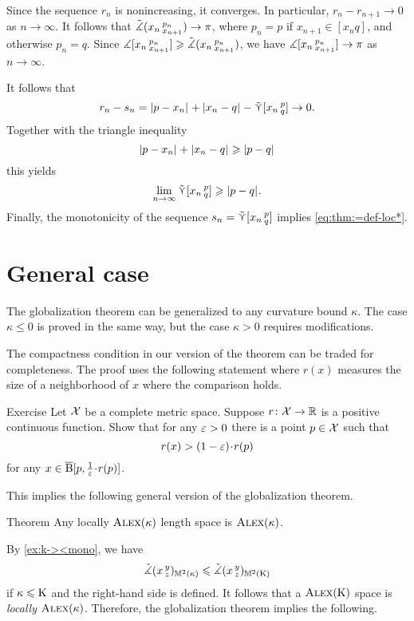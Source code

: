 Since the sequence $r_n$ is nonincreasing, it converges.
In particular, $r_n-r_{n+1}\to 0$ as $n\to\infty$.
It follows that $\tilde\measuredangle(x_n\,{}^{p_n}_{x_{n+1}})\to \pi$,
where $p_n=p$ if $x_{n+1}\in [x_nq]$, and otherwise $p_n=q$.
Since $\measuredangle[x_n\,{}^{p_n}_{x_{n+1}}]\geqslant\tilde\measuredangle(x_n\,{}^{p_n}_{x_{n+1}})$, we have
$\measuredangle[x_n\,{}^{p_n}_{x_{n+1}}]\to \pi$  as $n\to\infty$.

It follows that
\[r_n-s_n=|{p}-{x_n}|_{}^{{}}+|{x_n}-{q}|_{}^{{}}-\mathop{\tilde\curlyvee}\nolimits [x_n\,{}^{p}_{q}]\to 0.\] 
Together with the triangle inequality
\[
|{p}-{x_n}|_{}^{{}}+|{x_n}-{q}|_{}^{{}}\geqslant|{p}-{q}|_{}^{{}}
\]
this yields
\[\lim_{n\to\infty}\mathop{\tilde\curlyvee}\nolimits [x_n\,{}^{p}_{q}]\geqslant |{p}-{q}|_{}^{{}}.\]
Finally, the monotonicity of the sequence $s_n=\mathop{\tilde\curlyvee}\nolimits [x_n\,{}^{p}_{q}]$ implies \ref{eq:thm:=def-loc*}.
\qeds

\section{General case}

The globalization theorem  can be generalized to any curvature bound $\kappa$.
The case $\kappa\le 0$ is proved in the same way, but the case $\kappa>0$ requires modifications.

The compactness condition in our version of the theorem can be traded for completeness.
The proof uses the following statement where $r(x)$ measures the size of a neighborhood of $x$ where the comparison holds.

\begin{thm}{Exercise}\label{ex:alm-min}
Let $\mathcal{X}$ be a complete metric space.
Suppose $r\colon\mathcal{X}\to \mathbb{R}$ is a positive continuous function.
Show that for any $\varepsilon>0$ there is a point $p\in \mathcal{X}$ such that 
\[r(x)> (1-\eps)\cdot r(p)\] 
for any $x\in \cBall[p,\tfrac{1}{\eps}\cdot r(p)]$.

\end{thm}

This implies the following general version of the globalization theorem.

\begin{thm}{Theorem}\label{thm:globalization+}
Any locally $\textsc{Alex}(\kappa)$ length space is $\textsc{Alex}(\kappa)$.
\end{thm}

By \ref{ex:k-><mono}, we have
\[\tilde\measuredangle(x\,{}^{y}_{z})_{\mathbb{M}^2(\kappa)}\leqslant \tilde\measuredangle(x\,{}^{y}_{z})_{\mathbb{M}^2(\mathrm{K})}\]
if $\kappa\leqslant \mathrm{K}$ and the right-hand side is defined.
It follows that a $\textsc{Alex}(\mathrm{K})$ space is \textit{locally} $\textsc{Alex}(\kappa)$.
Therefore, the globalization theorem implies the following.

